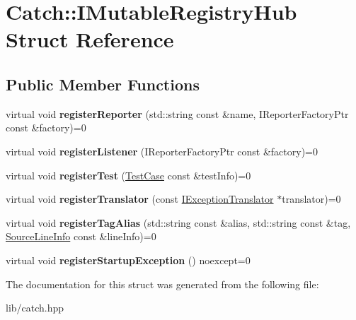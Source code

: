 \hypertarget{struct_catch_1_1_i_mutable_registry_hub}{}\section{Catch\+:\+:I\+Mutable\+Registry\+Hub Struct Reference}
\label{struct_catch_1_1_i_mutable_registry_hub}
\subsection*{Public Member Functions}
\begin{DoxyCompactItemize}
\item 
\mbox{\label{struct_catch_1_1_i_mutable_registry_hub_a1c0ac202ac31ee9f88e8ff5cbac4b243}} 
virtual void {\bfseries register\+Reporter} (std\+::string const \&name, I\+Reporter\+Factory\+Ptr const \&factory)=0
\item 
\mbox{\label{struct_catch_1_1_i_mutable_registry_hub_abd892a133f85581fd00ee75bb379ca56}} 
virtual void {\bfseries register\+Listener} (I\+Reporter\+Factory\+Ptr const \&factory)=0
\item 
\mbox{\label{struct_catch_1_1_i_mutable_registry_hub_a11b85c6744d88c9f83fe16ad4a8dd451}} 
virtual void {\bfseries register\+Test} (\mbox{\hyperlink{class_catch_1_1_test_case}{Test\+Case}} const \&test\+Info)=0
\item 
\mbox{\label{struct_catch_1_1_i_mutable_registry_hub_ae6825365102693cf7707db022a2c2b49}} 
virtual void {\bfseries register\+Translator} (const \mbox{\hyperlink{struct_catch_1_1_i_exception_translator}{I\+Exception\+Translator}} $\ast$translator)=0
\item 
\mbox{\label{struct_catch_1_1_i_mutable_registry_hub_abf2e386b6f94f615719ada711adbf822}} 
virtual void {\bfseries register\+Tag\+Alias} (std\+::string const \&alias, std\+::string const \&tag, \mbox{\hyperlink{struct_catch_1_1_source_line_info}{Source\+Line\+Info}} const \&line\+Info)=0
\item 
\mbox{\label{struct_catch_1_1_i_mutable_registry_hub_a72a7d5386851ac3200f8da794a009c86}} 
virtual void {\bfseries register\+Startup\+Exception} () noexcept=0
\end{DoxyCompactItemize}


The documentation for this struct was generated from the following file\+:\begin{DoxyCompactItemize}
\item 
lib/catch.\+hpp\end{DoxyCompactItemize}
